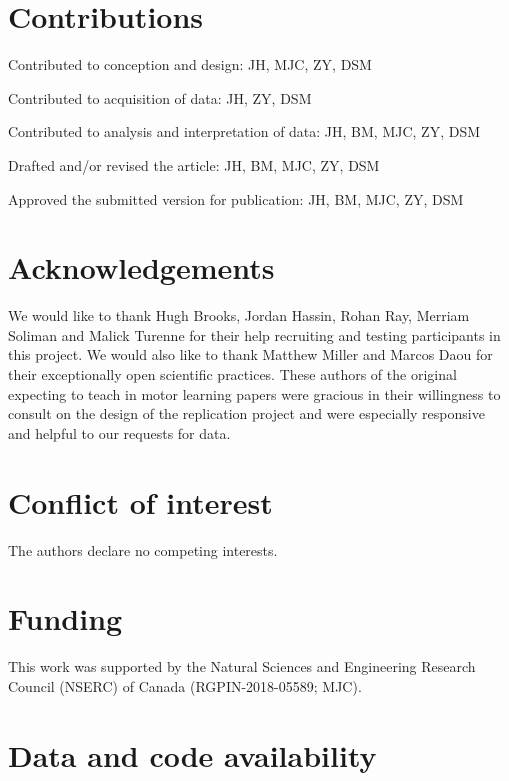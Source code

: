 \documentclass[
  english,
  man,floatsintext]{apa7}
\begin{document}
\hypertarget{contributions}{%
\section{Contributions}\label{contributions}}

\noindent Contributed to conception and design: JH, MJC, ZY, DSM

\noindent Contributed to acquisition of data: JH, ZY, DSM

\noindent Contributed to analysis and interpretation of data: JH, BM, MJC, ZY, DSM

\noindent Drafted and/or revised the article: JH, BM, MJC, ZY, DSM

\noindent Approved the submitted version for publication: JH, BM, MJC, ZY, DSM

\hypertarget{acknowledgements}{%
\section{Acknowledgements}\label{acknowledgements}}

We would like to thank Hugh Brooks, Jordan Hassin, Rohan Ray, Merriam Soliman and Malick Turenne for their help recruiting and testing participants in this project. We would also like to thank Matthew Miller and Marcos Daou for their exceptionally open scientific practices. These authors of the original expecting to teach in motor learning papers were gracious in their willingness to consult on the design of the replication project and were especially responsive and helpful to our requests for data.

\hypertarget{conflict-of-interest}{%
\section{Conflict of interest}\label{conflict-of-interest}}

The authors declare no competing interests.

\hypertarget{funding}{%
\section{Funding}\label{funding}}

This work was supported by the Natural Sciences and Engineering Research Council (NSERC) of Canada (RGPIN-2018-05589; MJC).

\hypertarget{data-and-code-availability}{%
\section{Data and code availability}\label{data-and-code-availability}}
\end{document}
